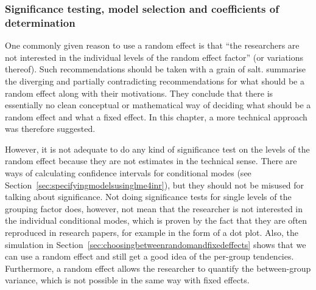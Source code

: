 \documentclass[a4paper,12pt]{article}
\begin{document}
\subsubsection{Significance testing, model selection and coefficients of determination}
\label{sec:significancetestingandcoefficientsofdetermination}

One commonly given reason to use a random effect is that ``the researchers are not interested in the individual levels of the random effect factor'' (or variations thereof).
Such recommendations should be taken with a grain of salt.
\citet[245--247]{GelmanHill2006} summarise the diverging and partially contradicting recommendations for what should be a random effect along with their motivations.
They conclude that there is essentially no clean conceptual or mathematical way of deciding what should be a random effect and what a fixed effect.
In this chapter, a more technical approach was therefore suggested.

However, it is not adequate to do any kind of significance test on the levels of the random effect because they are not estimates in the technical sense.
There are ways of calculating confidence intervals for conditional modes (see Section~\ref{sec:specifyingmodelsusinglme4inr}), but they should not be misused for talking about significance.
Not doing significance tests for single levels of the grouping factor does, however, not mean that the researcher is not interested in the individual conditional modes, which is proven by the fact that they are often reproduced in research papers, for example in the form of a dot plot.
Also, the simulation in Section~\ref{sec:choosingbetweenrandomandfixedeffects} shows that we can use a random effect and still get a good idea of the per-group tendencies.
Furthermore, a random effect allows the researcher to quantify the between-group variance, which is not possible in the same way with fixed effects.
\end{document}
